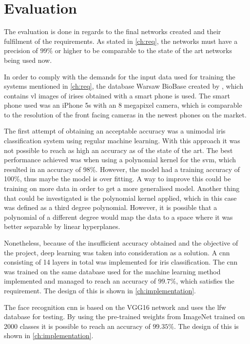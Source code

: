 \chapter{Evaluation}
The evaluation is done in regards to the final networks created and their fulfilment of the requirements. As stated in \autoref{ch:req}, the networks must have a precision of $99\%$ or higher to be comparable to the state of the art networks being used now.

In order to comply with the demands for the input data used for training the systems mentioned in \autoref{ch:req}, the database Warsaw BioBase created by \cite{Trokielewicz2016}, which contains \gls{vl} images of irises obtained with a smart phone is used. The smart phone used was an iPhone 5s with an 8 megapixel camera, which is comparable to the resolution of the front facing cameras in the newest phones on the market. 

The first attempt of obtaining an acceptable accuracy was a unimodal iris classification system using regular machine learning. With this approach it was not possible to reach as high an accuracy as of the state of the art. The best performance achieved was when using a polynomial kernel for the \gls{svm}, which resulted in an accuracy of 98\%. However, the model had a training accuracy of 100\%, thus maybe the model is over fitting. A way to improve this could be training on more data in order to get a more generalised model. Another thing that could be investigated is the polynomial kernel applied, which in this case was defined as a third degree polynomial. However, it is possible that a polynomial of a different degree would map the data to a space where it was better separable by linear hyperplanes. 

Nonetheless, because of the insufficient accuracy obtained and the objective of the project, deep learning was taken into consideration as a solution. A \gls{cnn} consisting of 14 layers in total was implemented for iris classification. The \gls{cnn} was trained on the same database used for the machine learning method implemented and managed to reach an accuracy of $99.7\%$, which satisfies the requirement. The design of this is shown in \autoref{ch:implementation}.

The face recognition \gls{cnn} is based on the VGG16 network and uses the \gls{lfw} database for testing. By using the pre-trained weights from ImageNet trained on 2000 classes it is possible to reach an accuracy of $99.35\%$. The design of this is shown in \autoref{ch:implementation}.	

